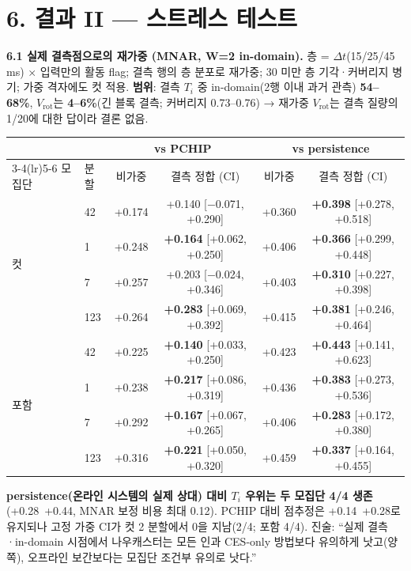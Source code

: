\documentclass[10pt,a4paper]{article}
\newcommand{\Ti}{\ensuremath{T_i}}
\newcommand{\Vrot}{\ensuremath{V_\mathrm{rot}}}
\newcommand{\pass}[1]{\textbf{#1}}
\begin{document}
\section*{6. 결과 II — 스트레스 테스트}
\textbf{6.1 실제 결측점으로의 재가중 (MNAR, W=2 in-domain).} 층 = $\Delta t$(15/25/45 ms) $\times$ 입력만의 활동 flag; 결측 행의 층 분포로 재가중; 30 미만 층 기각·커버리지 병기; 가중 격자에도 컷 적용. \textbf{범위}: 결측 \Ti{} 중 in-domain(2행 이내 과거 관측) \textbf{54–68\%}, \Vrot{}는 \textbf{4–6\%}(긴 블록 결측; 커버리지 0.73–0.76) → 재가중 \Vrot{}는 결측 질량의 1/20에 대한 답이라 결론 없음.
\begin{center}\small
\begin{tabular}{llcccc}\toprule
 & & \multicolumn{2}{c}{vs PCHIP} & \multicolumn{2}{c}{vs persistence} \\ \cmidrule(lr){3-4}\cmidrule(lr){5-6}
모집단 & 분할 & 비가중 & 결측 정합 (CI) & 비가중 & 결측 정합 (CI) \\ \midrule
\multirow{4}{*}{컷}
 & 42 & +0.174 & +0.140 [$-$0.071, +0.290] & +0.360 & \pass{+0.398} [+0.278, +0.518] \\
 & 1 & +0.248 & \pass{+0.164} [+0.062, +0.250] & +0.406 & \pass{+0.366} [+0.299, +0.448] \\
 & 7 & +0.257 & +0.203 [$-$0.024, +0.346] & +0.403 & \pass{+0.310} [+0.227, +0.398] \\
 & 123 & +0.264 & \pass{+0.283} [+0.069, +0.392] & +0.415 & \pass{+0.381} [+0.246, +0.464] \\ \midrule
\multirow{4}{*}{포함}
 & 42 & +0.225 & \pass{+0.140} [+0.033, +0.250] & +0.423 & \pass{+0.443} [+0.141, +0.623] \\
 & 1 & +0.238 & \pass{+0.217} [+0.086, +0.319] & +0.436 & \pass{+0.383} [+0.273, +0.536] \\
 & 7 & +0.292 & \pass{+0.167} [+0.067, +0.265] & +0.406 & \pass{+0.283} [+0.172, +0.380] \\
 & 123 & +0.316 & \pass{+0.221} [+0.050, +0.320] & +0.459 & \pass{+0.337} [+0.164, +0.455] \\ \bottomrule
\end{tabular}
\end{center}
\textbf{persistence(온라인 시스템의 실제 상대) 대비 \Ti{} 우위는 두 모집단 4/4 생존}(+0.28~+0.44, MNAR 보정 비용 최대 0.12). PCHIP 대비 점추정은 +0.14~+0.28로 유지되나 고정 가중 CI가 컷 2 분할에서 0을 지남(2/4; 포함 4/4). 진술: ``실제 결측·in-domain 시점에서 나우캐스터는 모든 인과 CES-only 방법보다 유의하게 낫고(양쪽), 오프라인 보간보다는 모집단 조건부 유의로 낫다.''
\end{document}
